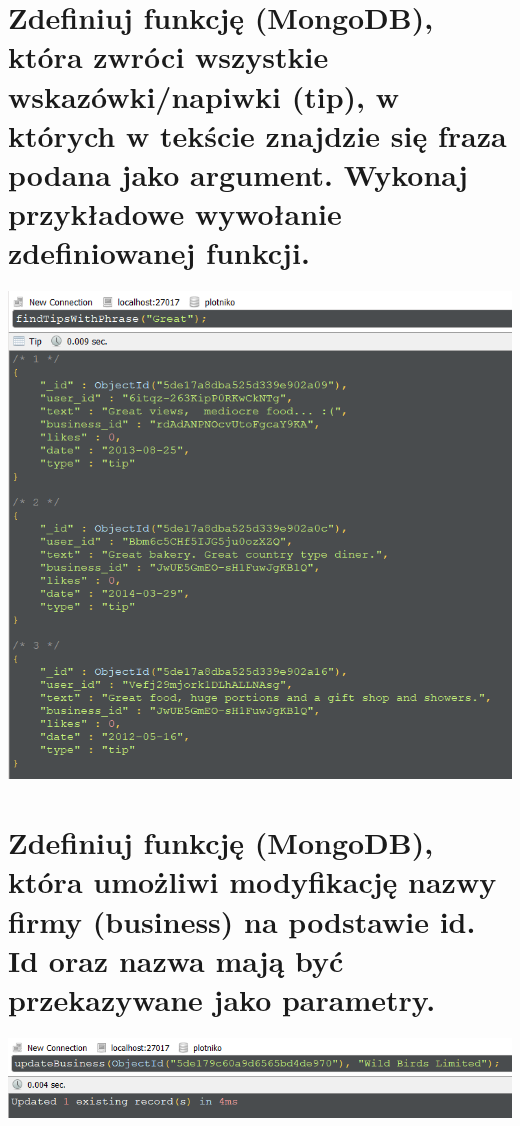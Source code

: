 \documentclass[a4paper, 11pt]{article}
\begin{document}
    \newpage


    \section{Zdefiniuj funkcję (MongoDB), która zwróci wszystkie wskazówki/napiwki (tip), w
    których w tekście znajdzie się fraza podana jako argument. Wykonaj przykładowe
    wywołanie zdefiniowanej funkcji. }

    

    \begin{center}
        \includegraphics[scale=0.8]{images/task3/Execution.png}
    \end{center}

    \newpage

    \section{Zdefiniuj funkcję (MongoDB), która umożliwi modyfikację nazwy firmy (business) na
    podstawie id. Id oraz nazwa mają być przekazywane jako parametry. }

    

    \begin{center}
        \includegraphics[scale=0.8]{images/task4/Execution.png}
    \end{center}
\end{document}

